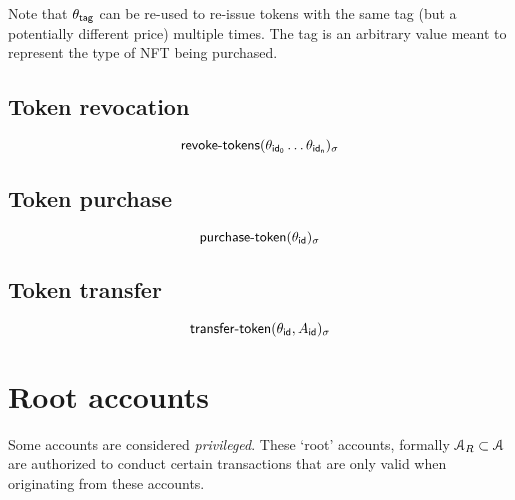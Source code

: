 Note that $\theta_{\mathsf{tag}}$ can be re-used to re-issue tokens with the same tag (but a potentially different price) multiple times. The tag is an arbitrary value meant to represent
the type of NFT being purchased.

\subsection{Token revocation}
\[
    \operatorname{\mathsf{revoke-tokens}}\lparen\theta_{\mathsf{id_0}} \ldots \theta_{\mathsf{id_n}}\rparen_\sigma
\]

\subsection{Token purchase}
\[
    \operatorname{\mathsf{purchase-token}}\lparen\theta_{\mathsf{id}}\rparen_\sigma
\]

\subsection{Token transfer}
\[
    \operatorname{\mathsf{transfer-token}}\lparen\theta_{\mathsf{id}}, A_{\mathsf{id}}\rparen_\sigma
\]

\section{Root accounts}
Some accounts are considered \emph{privileged}. These `root' accounts,
formally $\mathcal{A}_R \subset \mathcal{A}$ are authorized to conduct certain transactions
that are only valid when originating from these accounts.

